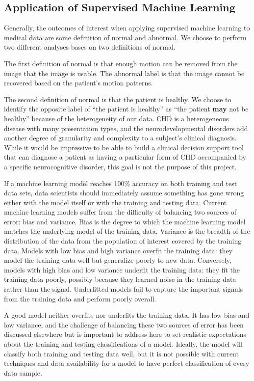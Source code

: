 \subsection{Application of Supervised Machine Learning}

Generally, the outcomes of interest when applying supervised machine learning to medical data are some definition of normal and abnormal. We choose to perform two different analyses bases on two definitions of normal. 

The first definition of normal is that enough motion can be removed from the image that the image is usable. The abnormal label is that the image cannot be recovered based on the patient's motion patterns.

The second definition of normal is that the patient is healthy. We choose to identify the opposite label of ``the patient is healthy'' as ``the patient \textbf{may} not be healthy'' because of the heterogeneity of our data. CHD is a heterogeneous disease with many presentation types, and the neurodevelopmental disorders add another degree of granularity and complexity to a subject's clinical diagnosis. While it would be impressive to be able to build a clinical decision support tool that can diagnose a patient as having a particular form of CHD accompanied by a specific neurocognitive disorder, this goal is not the purpose of this project.

If a machine learning model reaches 100\% accuracy on both training and test data sets, data scientists should immediately assume something has gone wrong either with the model itself or with the training and testing data. Current machine learning models suffer from the difficulty of balancing two sources of error: bias and variance. Bias is the degree to which the machine learning model matches the underlying model of the training data. Variance is the breadth of the distribution of the data from the population of interest covered by the training data. Models with low bias and high variance overfit the training data: they model the training data well but generalize poorly to new data. Conversely, models with high bias and low variance underfit the training data: they fit the training data poorly, possibly because they learned noise in the training data rather than the signal. Underfitted models fail to capture the important signals from the training data and perform poorly overall.

A good model neither overfits nor underfits the training data. It has low bias and low variance, and the challenge of balancing these two sources of error has been discussed elsewhere but is important to address here to set realistic expectations about the training and testing classifications of a model. Ideally, the model will classify both training and testing data well, but it is not possible with current techniques and data availability for a model to have perfect classification of every data sample. 

